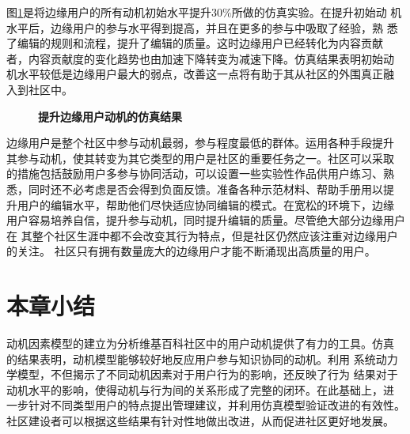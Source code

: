 图\ref{fig:improve9}是将边缘用户的所有动机初始水平提升$30\%$所做的仿真实验。在提升初始动
机水平后，边缘用户的参与水平得到提高，并且在更多的参与中吸取了经验，熟
悉了编辑的规则和流程，提升了编辑的质量。这时边缘用户已经转化为内容贡献
者，内容贡献度的变化趋势也由加速下降转变为减速下降。仿真结果表明初始动
机水平较低是边缘用户最大的弱点，改善这一点将有助于其从社区的外围真正融
入到社区中。

\begin{figure}[!htb]
  \centering
  \caption{\small{\textbf{提升边缘用户动机的仿真结果}}}
  \label{fig:improve9}
\end{figure}

边缘用户是整个社区中参与动机最弱，参与程度最低的群体。运用各种手段提升
其参与动机，使其转变为其它类型的用户是社区的重要任务之一。社区可以采取
的措施包括鼓励用户多参与协同活动，可以设置一些实验性作品供用户练习、熟
悉，同时还不必考虑是否会得到负面反馈。准备各种示范材料、帮助手册用以提
升用户的编辑水平，帮助他们尽快适应协同编辑的模式。在宽松的环境下，边缘
用户容易培养自信，提升参与动机，同时提升编辑的质量。尽管绝大部分边缘用户在
其整个社区生涯中都不会改变其行为特点，但是社区仍然应该注重对边缘用户的关注。
社区只有拥有数量庞大的边缘用户才能不断涌现出高质量的用户。

\section{本章小结}

动机因素模型的建立为分析维基百科社区中的用户动机提供了有力的工具。仿真
的结果表明，动机模型能够较好地反应用户参与知识协同的动机。利用
系统动力学模型，不但揭示了不同动机因素对于用户行为的影响，还反映了行为
结果对于动机水平的影响，使得动机与行为间的关系形成了完整的闭环。在此基础上，进
一步针对不同类型用户的特点提出管理建议，并利用仿真模型验证改进的有效性。
社区建设者可以根据这些结果有针对性地做出改进，从而促进社区更好地发展。



